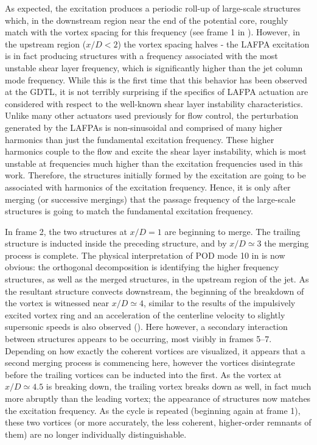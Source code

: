 As expected, the excitation produces a periodic roll-up of large-scale structures which, in the downstream region near the end of the potential core, roughly match with the vortex spacing for this frequency (see frame 1 in ).
However, in the upstream region ($x/D < 2$) the vortex spacing halves - the LAFPA excitation is in fact producing structures with a frequency associated with the most unstable shear layer frequency, which is significantly higher than the jet column mode frequency.
While this is the first time that this behavior has been observed at the GDTL, it is not terribly surprising if the specifics of LAFPA actuation are considered with respect to the well-known shear layer instability characteristics.
Unlike many other actuators used previously for flow control, the perturbation generated by the LAFPAs is non-sinusoidal and comprised of many higher harmonics than just the fundamental excitation frequency.
These higher harmonics couple to the flow and excite the shear layer instability, which is most unstable at frequencies much higher than the excitation frequencies used in this work.
Therefore, the structures initially formed by the excitation are going to be associated with harmonics of the excitation frequency.
Hence, it is only after merging (or successive mergings) that the passage frequency of the large-scale structures is going to match the fundamental excitation frequency.

In frame 2, the two structures at $x/D = 1$ are beginning to merge.
The trailing structure is inducted inside the preceding structure, and by $x/D \simeq 3$ the merging process is complete.
The physical interpretation of POD mode 10 in  is now obvious: the orthogonal decomposition is identifying the higher frequency structures, as well as the merged structures, in the upstream region of the jet.
As the resultant structure convects downstream, the beginning of the breakdown of the vortex is witnessed near $x/D \simeq 4$, similar to the results of the impulsively excited vortex ring and an acceleration of the centerline velocity to slightly supersonic speeds is also observed ().
Here however, a secondary interaction between structures appears to be occurring, most visibly in frames 5--7. 
Depending on how exactly the coherent vortices are visualized, it appears that a second merging process is commencing here, however the vortices disintegrate before the trailing vortices can be inducted into the first. 
As the vortex at $x/D \simeq 4.5$ is breaking down, the trailing vortex breaks down as well, in fact much more abruptly than the leading vortex; the appearance of structures now matches the excitation frequency.
As the cycle is repeated (beginning again at frame 1), these two vortices (or more accurately, the less coherent, higher-order remnants of them) are no longer individually distinguishable.


